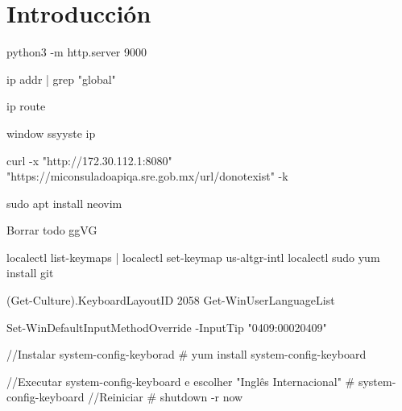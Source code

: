 


\section{Introducción}



python3 -m http.server 9000

ip addr | grep "global"

ip route 

window ssyyste ip 

curl -x "http://172.30.112.1:8080" "https://miconsuladoapiqa.sre.gob.mx/url/donotexist" -k


sudo apt install neovim


Borrar todo
ggVG






localectl list-keymaps |
localectl set-keymap us-altgr-intl
localectl 
sudo yum install git


(Get-Culture).KeyboardLayoutID
2058
Get-WinUserLanguageList



Set-WinDefaultInputMethodOverride -InputTip "0409:00020409"




//Instalar system-config-keyborad
# yum install system-config-keyboard
 
//Executar system-config-keyboard e escolher "Inglês Internacional"
# system-config-keyboard
//Reiniciar
# shutdown -r now